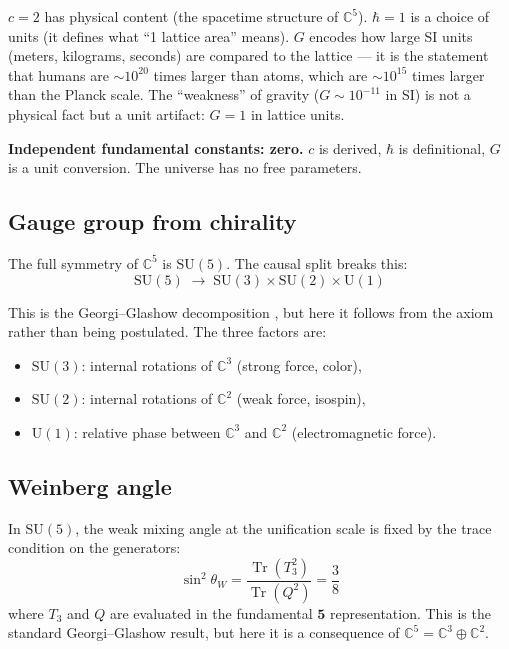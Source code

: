 \documentclass[12pt]{article}
\theoremstyle{remark}
\theoremstyle{definition}
\newcommand{\tr}{\operatorname{Tr}}
\begin{document}
$c = 2$ has physical content (the spacetime structure of $\mathbb{C}^5$). $\hbar = 1$ is a choice of units (it defines what ``1 lattice area'' means). $G$ encodes how large SI units (meters, kilograms, seconds) are compared to the lattice --- it is the statement that humans are $\sim\!10^{20}$ times larger than atoms, which are $\sim\!10^{15}$ times larger than the Planck scale. The ``weakness'' of gravity ($G \sim 10^{-11}$ in SI) is not a physical fact but a unit artifact: $G = 1$ in lattice units.

\textbf{Independent fundamental constants: zero.} $c$ is derived, $\hbar$ is definitional, $G$ is a unit conversion. The universe has no free parameters.

\subsection{Gauge group from chirality}

The full symmetry of $\mathbb{C}^5$ is $\text{SU}(5)$. The causal split breaks this:
\begin{equation}
\text{SU}(5) \;\to\; \text{SU}(3) \times \text{SU}(2) \times \text{U}(1)
\end{equation}

This is the Georgi--Glashow decomposition \cite{GeorgiGlashow}, but here it follows from the axiom rather than being postulated. The three factors are:
\begin{itemize}
\item $\text{SU}(3)$: internal rotations of $\mathbb{C}^3$ (strong force, color),
\item $\text{SU}(2)$: internal rotations of $\mathbb{C}^2$ (weak force, isospin),
\item $\text{U}(1)$: relative phase between $\mathbb{C}^3$ and $\mathbb{C}^2$ (electromagnetic force).
\end{itemize}

\subsection{Weinberg angle}

In $\text{SU}(5)$, the weak mixing angle at the unification scale is fixed by the trace condition on the generators:
\begin{equation}
\sin^2\theta_W = \frac{\tr(T_3^2)}{\tr(Q^2)} = \frac{3}{8}
\end{equation}
where $T_3$ and $Q$ are evaluated in the fundamental $\mathbf{5}$ representation. This is the standard Georgi--Glashow result, but here it is a consequence of $\mathbb{C}^5 = \mathbb{C}^3 \oplus \mathbb{C}^2$.
\end{document}
